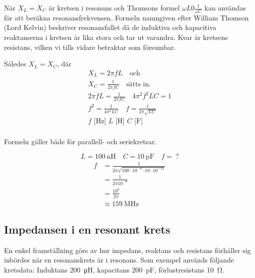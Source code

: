 När \(X_L = X_C\) är kretsen i resonans och Thomsons formel
\(\omega L 0 \frac{1}{\omega C}\) kan användas för att beräkna
resonansfrekvensen.
Formeln namngiven efter William Thomson (Lord Kelvin) beskriver resonansfallet
då de induktiva och kapacitiva reaktanserna i kretsen är lika stora och tar ut
varandra.
Kvar är kretsens resistans, vilken vi tills vidare betraktar som försumbar.

Således \(X_L = X_C\), där
%
\begin{gather*}
  X_L = 2\pi fL \quad \text{och} \\
  X_C = \frac{1}{2\pi fC} \quad \text{sätts in.} \\
  2\pi fL = \frac{1}{2\pi fC} \quad 4\pi ^2f^2LC = 1 \\
  f^2 = \frac{1}{4\pi ^2LC} \quad f = \frac{1}{2\pi \sqrt{LC}} \\
  f\text{ [Hz] }L\text{ [H] }C\text{ [F] } \\
\end{gather*}

Formeln gäller både för parallell- och seriekretsar.

\vspace*{1ex}
\begin{exempelbox}
\[L = \qty{100}{\nano\henry} \quad C = \qty{10}{\pico\farad} \quad f =\ ?\]
\tcblower
\begin{align*}
  f &= \frac{1}{2\pi \sqrt{100 \cdot 10^{-9} \cdot 10 \cdot 10^{-12}}} \\
  &= \frac{1}{2\pi 10^{-9}} \\
  &= \frac{10^9}{2\pi } \\
  &\approx \qty{159}{\mega\hertz}
\end{align*}
\end{exempelbox}

\subsection{Impedansen i en resonant krets}
\label{impedans_resonant_krets}


En enkel framställning görs av hur impedans, reaktans och resistans förhåller
sig inbördes när en resonanskrets är i resonans.
Som exempel används följande kretsdata: Induktans \qty{200}{\micro\henry},
kapacitans \qty{200}{\pico\farad}, förlustresistans \qty{10}{\ohm}.

